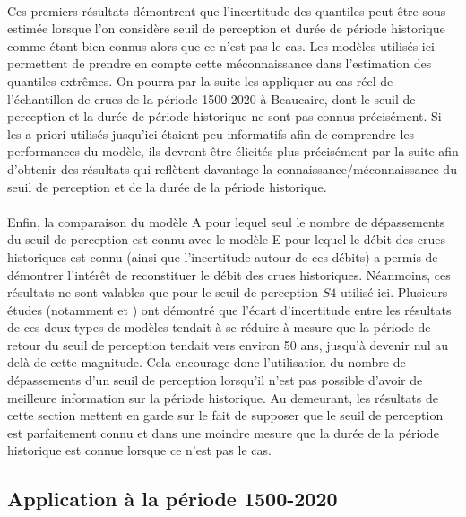 \documentclass[11pt]{article}
\begin{document}
	\paragraph{} Ces premiers résultats démontrent que l'incertitude des quantiles peut être sous-estimée	lorsque l'on considère seuil de perception et durée de période historique comme étant bien connus alors que ce n'est pas le cas. Les modèles utilisés ici permettent de prendre en compte cette méconnaissance dans l'estimation des quantiles extrêmes. On pourra par la suite les appliquer au cas réel de l'échantillon de crues de la période 1500-2020 à Beaucaire, dont le seuil de perception et la durée de période historique ne sont pas connus précisément. Si les a priori utilisés jusqu'ici étaient peu informatifs afin de comprendre les performances du modèle, ils devront être élicités plus précisément par la suite afin d'obtenir des résultats qui reflètent davantage la connaissance/méconnaissance du seuil de perception et de la durée de la période historique.
		
	\paragraph{} Enfin, la comparaison du modèle A pour lequel seul le nombre de dépassements du seuil de perception est connu avec le modèle E pour lequel le débit des crues historiques est connu (ainsi que l'incertitude autour de ces débits) a permis de démontrer l'intérêt de reconstituer le débit des crues historiques. Néanmoins, ces résultats ne sont valables que pour le seuil de perception $S4$ utilisé ici. Plusieurs études (notamment \citet{stedinger_flood_1986} et \citet{payrastre_usefulness_2011}) ont démontré que l'écart d'incertitude entre les résultats de ces deux types de modèles tendait à se réduire à mesure que la période de retour du seuil de perception tendait vers environ 50 ans, jusqu'à devenir nul au delà de cette magnitude. Cela encourage donc l'utilisation du nombre de dépassements d'un seuil de perception lorsqu'il n'est pas possible d'avoir de meilleure information sur la période historique. Au demeurant, les résultats de cette section mettent en garde sur le fait de supposer que le seuil de perception est parfaitement connu et dans une moindre mesure que la durée de la période historique est connue lorsque ce n'est pas le cas.
	
	\subsection{Application à la période 1500-2020}
	\label{subsec:Results1500}
	
\end{document}
